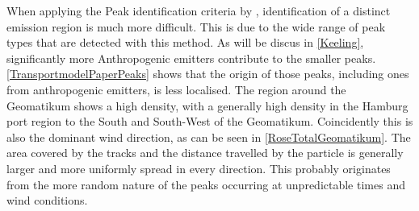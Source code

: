 When applying the Peak identification criteria by \cite{Menoud.2021}, identification of a distinct emission region is much more difficult. This is due to the wide range of peak types that are detected with this method. As will be discus in \cref{Keeling}, significantly more Anthropogenic emitters contribute to the smaller peaks. \cref{TransportmodelPaperPeaks} shows that the origin of those peaks, including ones from anthropogenic emitters, is less localised. The region around the Geomatikum shows a high density, with a generally high density in the Hamburg port region to the South and South-West of the Geomatikum. Coincidently this is also the dominant wind direction, as can be seen in \cref{RoseTotalGeomatikum}. The area covered by the tracks and the distance travelled by the particle is generally larger and more uniformly spread in every direction. This probably originates from the more random nature of the peaks occurring at unpredictable times and wind conditions.  
